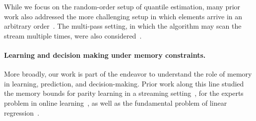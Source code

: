While we focus on the random-order setup of quantile estimation, many prior work also addressed the more challenging setup in which elements arrive in an arbitrary order~\cite{MP80,manku1998approximate,KLL16,masson2019ddsketch,gupta2024optimal}. The multi-pass setting, in which the algorithm may scan the stream multiple times, were also considered~\cite{MP80,guha2009stream}.

\paragraph{Learning and decision making under memory constraints.} More broadly, our work is part of the endeavor to understand the role of memory in learning, prediction, and decision-making. Prior work along this line studied the memory bounds for parity learning in a streaming setting~\cite{valiant2016information,steinhardt2016memory,kol2017time,raz2018fast, garg2018extractor}, for the experts problem in online learning~\cite{srinivas2022memory,PZ23,peng2023near}, as well as the fundamental problem of linear regression~\cite{sharan2019memory, marsden2022efficient, blanchard2023memory, blanchard2024gradient}.